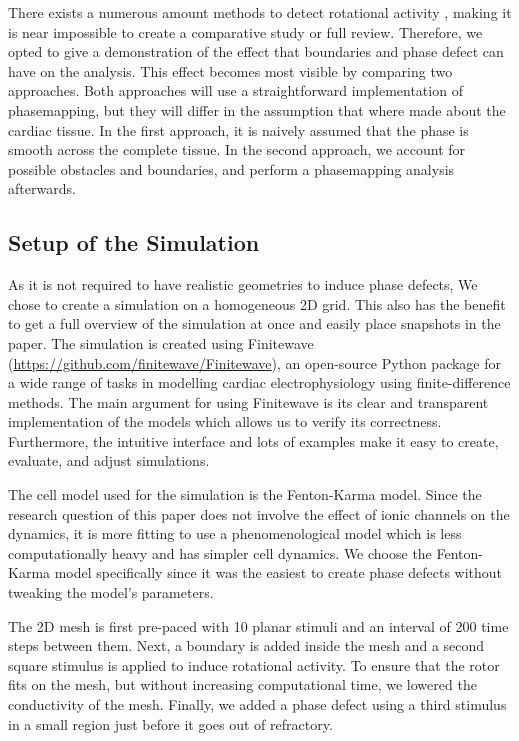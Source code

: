 \documentclass[twocolumn]{article}
\begin{document}
There exists a numerous amount methods to detect rotational activity \autocite{pikunov2023the, gurevich2019robust, li2020standardizing},
making it is near impossible to create a comparative study or full review.
Therefore, we opted to give a demonstration of the effect
that boundaries and phase defect can have on the analysis.
This effect becomes most visible by comparing two approaches.
Both approaches will use a straightforward implementation of phasemapping, but
they will differ in the assumption that where made about the cardiac tissue.
In the first approach, it is naively assumed
that the phase is smooth across the complete tissue.
In the second approach, we account for possible obstacles and boundaries,
and perform a phasemapping analysis afterwards.

\subsection{Setup of the Simulation}\label{setup-of-the-simulation}

As it is not required to have realistic geometries to induce phase
defects, We chose to create a simulation on a homogeneous 2D grid. This
also has the benefit to get a full overview of the simulation at once
and easily place snapshots in the paper.
The simulation is created using Finitewave
(\url{https://github.com/finitewave/Finitewave}), an open-source Python
package for a wide range of tasks in modelling cardiac electrophysiology
using finite-difference methods. The main argument for using Finitewave
is its clear and transparent implementation of the models which allows
us to verify its correctness. Furthermore, the intuitive interface and
lots of examples make it easy to create, evaluate, and adjust
simulations.

The cell model used for the simulation is the Fenton-Karma model. Since
the research question of this paper does not involve the effect of ionic
channels on the dynamics, it is more fitting to use a phenomenological
model which is less computationally heavy and has simpler cell dynamics.
We choose the Fenton-Karma model specifically since it was the easiest
to create phase defects without tweaking the model's parameters.

The 2D mesh is first pre-paced with 10 planar stimuli and an interval of
200 time steps between them. Next, a boundary is added inside the mesh
and a second square stimulus is applied to induce rotational activity.
To ensure that the rotor fits on the mesh, but without increasing
computational time, we lowered the conductivity of the mesh. Finally, we
added a phase defect using a third stimulus in a small region just
before it goes out of refractory.
\end{document}
